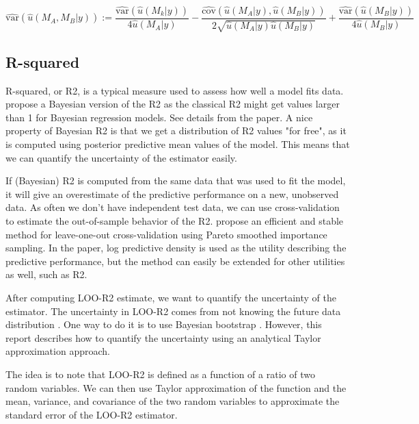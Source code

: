 \documentclass{article}
\begin{document}
\begin{equation}
    \widehat{\text{var}} \left( \hat{u}(M_A, M_B | y) \right) :=  \frac{\widehat{\text{var}}\left( \hat{u}(M_k | y) \right)}{4 \hat{u}(M_A | y)} - \frac{\widehat{\text{cov}}(\hat{u}(M_A | y), \hat{u}(M_B | y)) }{2 \sqrt{\hat{u}(M_A | y) \hat{u}(M_B | y)}} + \frac{\widehat{\text{var}}\left( \hat{u}(M_B | y) \right)}{4 \hat{u}(M_B | y)} \label{eq:var-loo-diff-rmse}
\end{equation}

\subsection{R-squared}
R-squared, or R2, is a typical measure used to assess how well a model fits data. \cite{gelman_r-squared_2019} propose a Bayesian version of the R2 as the classical R2 might get values larger than 1 for Bayesian regression models. See details from the paper. A nice property of Bayesian R2 is that we get a distribution of R2 values "for free", as it is computed using posterior predictive mean values of the model. This means that we can quantify the uncertainty of the estimator easily.

If (Bayesian) R2 is computed from the same data that was used to fit the model, it will give an overestimate of the predictive performance on a new, unobserved data. As often we don't have independent test data, we can use cross-validation to estimate the out-of-sample behavior of the R2. \cite{vehtari_practical_2016} propose an efficient and stable method for leave-one-out cross-validation using Pareto smoothed importance sampling. In the paper, log predictive density is used as the utility describing the predictive performance, but the method can easily be extended for other utilities as well, such as R2.

After computing LOO-R2 estimate, we want to quantify the uncertainty of the estimator. The uncertainty in LOO-R2 comes from not knowing the future data distribution \citep{vehtari_survey_2012}. One way to do it is to use Bayesian bootstrap \citep{rubin_bayesian_1981}. However, this report describes how to quantify the uncertainty using an analytical Taylor approximation approach.

The idea is to note that LOO-R2 is defined as a function of a ratio of two random variables. We can then use Taylor approximation of the function and the mean, variance, and covariance of the two random variables to approximate the standard error of the LOO-R2 estimator. 
\end{document}

